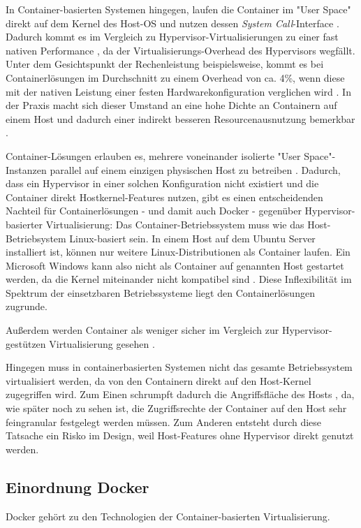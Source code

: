 \documentclass[11pt,a4paper,oneside]{report}
\begin{document}
      In Container-basierten Systemen hingegen, laufen die Container im "User Space" direkt auf dem Kernel des Host-OS und nutzen dessen \emph{System Call}-Interface \cite[S.6+7]{dockerBook}. Dadurch kommt es im Vergleich zu Hypervisor-Virtualisierungen zu einer fast nativen Performance \cite[S.1]{containerVirtPerformance}, da der Virtualisierungs-Overhead des Hypervisors wegfällt. Unter dem Gesichtspunkt der Rechenleistung beispielsweise, kommt es bei Containerlösungen im Durchschnitt zu einem Overhead von ca. 4\%, wenn diese mit der nativen Leistung einer festen Hardwarekonfiguration verglichen wird \cite[S.4]{containerVirtPerformance}. In der Praxis macht sich dieser Umstand an eine hohe Dichte an Containern auf einem Host und dadurch einer indirekt besseren Resourcenausnutzung bemerkbar \cite[S.7+8]{dockerBook}.

      Container-Lösungen erlauben es, mehrere voneinander isolierte "User Space"-Instanzen parallel auf einem einzigen physischen Host zu betreiben \cite[S.6]{dockerBook}. Dadurch, dass ein Hypervisor in einer solchen Konfiguration nicht existiert und die Container direkt Hostkernel-Features nutzen, gibt es einen entscheidenden Nachteil für Containerlösungen - und damit auch Docker - gegenüber Hypervisor-basierter Virtualisierung: Das Container-Betriebssystem muss wie das Host-Betriebsystem Linux-basiert sein. In einem Host auf dem Ubuntu Server installiert ist, können nur weitere Linux-Distributionen als Container laufen. Ein Microsoft Windows kann also nicht als Container auf genannten Host gestartet werden, da die Kernel miteinander nicht kompatibel sind \cite[S.6]{dockerBook}. Diese Inflexibilität im Spektrum der einsetzbaren Betriebssysteme liegt den Containerlösungen zugrunde.

      Außerdem werden Container als weniger sicher im Vergleich zur Hypervisor-gestützen Virtualisierung gesehen \cite[S.6]{dockerBook}.

      Hingegen muss in containerbasierten Systemen nicht das gesamte Betriebssystem virtualisiert werden, da von den Containern direkt auf den Host-Kernel zugegriffen wird. Zum Einen schrumpft dadurch die Angriffsfläche des Hosts \cite[S.6]{dockerBook}, da, wie später noch zu sehen ist, die Zugriffsrechte der Container auf den Host sehr feingranular festgelegt werden müssen. Zum Anderen entsteht durch diese Tatsache ein Risko im Design, weil Host-Features ohne Hypervisor direkt genutzt werden.

	  \subsection{Einordnung Docker}
      Docker gehört zu den Technologien der Container-basierten Virtualisierung.
\end{document}
